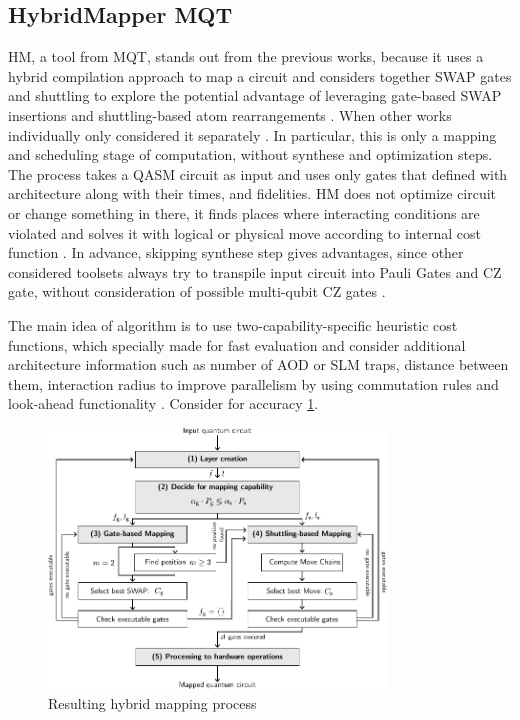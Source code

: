 \subsection{HybridMapper MQT}
\ac{HM}, a tool from \ac{MQT}, stands out from the previous works, 
because it uses a hybrid compilation approach to map a circuit 
and considers together SWAP gates and shuttling to explore the potential advantage of leveraging gate-based SWAP insertions 
and shuttling-based atom rearrangements \parencite{schmid2023hybridcircuitmappingleveraging}.
When other works individually only considered it separately \parencite{Tan_2025_Enola,huang2025dasatomdivideandshuttleatomapproach,10082942}.
In particular, this is only a mapping and scheduling stage of computation, without synthese and optimization steps.
The process takes a QASM circuit as input and uses only gates that defined with architecture along with their times, and fidelities.
\ac{HM} does not optimize circuit or change something in there, it finds places where interacting conditions are violated 
and solves it with logical or physical move according to internal cost function \parencite{schmid2023hybridcircuitmappingleveraging}. 
In advance, skipping synthese step gives advantages, 
since other considered toolsets always try to transpile input circuit into Pauli Gates and CZ gate, without consideration of possible multi-qubit CZ gates \parencite{schmid2023hybridcircuitmappingleveraging}.

The main idea of algorithm is to use two-capability-specific heuristic cost functions, 
which specially made for fast evaluation 
and consider additional architecture information 
such as number of \ac{AOD} or \ac{SLM} traps, distance between them, interaction radius 
to improve parallelism by using commutation rules and look-ahead functionality \parencite{schmid2023hybridcircuitmappingleveraging}.
Consider for accuracy \ref{fig:overview_HybridMapper}.

\begin{figure}[htbp]
  \centering
    \includegraphics[width=0.8\textwidth]{figures/overviewHybridMapper.pdf}
    \caption{Resulting hybrid mapping process \parencite{schmid2023hybridcircuitmappingleveraging}}
    \label{fig:overview_HybridMapper}
\end{figure}
